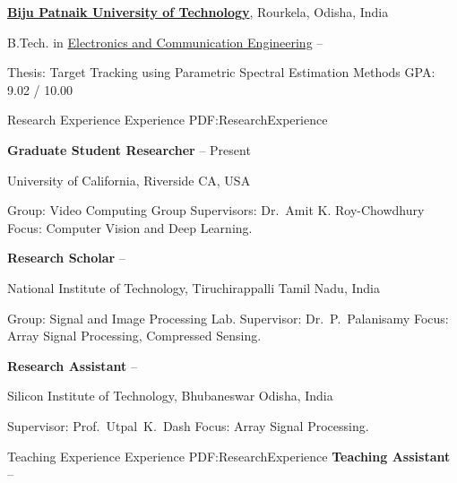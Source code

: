 \documentclass[letterpaper,MMMyyyy,nonstopmode]{simpleresumecv}
\begin{document}
\begin{Body}
\BigGap
\Entry
\href{http://www.bput.ac.in}
{\textbf{Biju Patnaik University of Technology}},
Rourkela, Odisha, India

\Gap
\BulletItem
B.Tech. in
\href{https://silicon.ac.in/sitbbsr/etc.php}
{Electronics and Communication Engineering}
\hfill
{} --
\begin{Detail}
\SubBulletItem
Thesis: 
Target Tracking using Parametric Spectral Estimation Methods
\SubBulletItem
GPA: 9.02 / 10.00
\end{Detail}


\Section
{Research Experience}
{Experience}
{PDF:ResearchExperience}

\Entry
{\textbf{Graduate Student Researcher}}
\hfill
{} --
Present

\Gap
\BulletItem
University of California, Riverside
\hfill
CA, USA
\begin{Detail}
\SubBulletItem
Group:
Video Computing Group 
\SubBulletItem
Supervisors:
Dr.~Amit K. Roy-Chowdhury
\SubBulletItem
Focus:
Computer Vision and Deep Learning.
\end{Detail}

\Entry
{\textbf{Research Scholar}}
\hfill
{} --

\Gap
\BulletItem
National Institute of Technology, Tiruchirappalli
\hfill
Tamil Nadu, India
\begin{Detail}
\SubBulletItem
Group:
Signal and Image Processing Lab.
\SubBulletItem
Supervisor:
Dr.~P.~Palanisamy 
\SubBulletItem
Focus:
Array Signal Processing, Compressed Sensing.
\end{Detail}

\Entry
{\textbf{Research Assistant}}
\hfill
{} --

\Gap
\BulletItem
Silicon Institute of Technology, Bhubaneswar
\hfill
Odisha, India
\begin{Detail}
\SubBulletItem
Supervisor:
Prof.~Utpal~K.~Dash
\SubBulletItem
Focus:
Array Signal Processing.  
\end{Detail}


\Section
{Teaching Experience}
{Experience}
{PDF:ResearchExperience}
\Entry
{\textbf{Teaching Assistant}}
\hfill
{} --


\end{Body}
\end{document}

